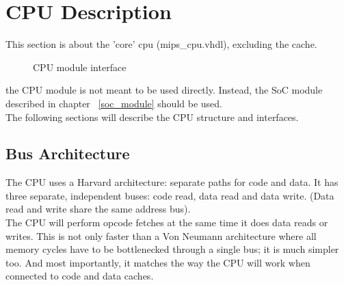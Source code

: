 
\chapter{CPU Description}
\label{cpu_description}

    This section is about the 'core' cpu (mips\_cpu.vhdl), excluding the cache.

    \begin{figure}[h]
    \caption{CPU module interface\label{cpu_symbol}}
    \end{figure}
    
    the CPU module is not meant to be used directly. Instead, the SoC module
    described in chapter ~\ref{soc_module} should be used.\\
    
    The following sections will describe the CPU structure and interfaces.\\
    
\section{Bus Architecture}
\label{bus_architecture}
    The CPU uses a Harvard architecture: separate paths for code and data. It
    has three separate, independent buses: code read, data read and data write.
    (Data read and write share the same address bus).\\

    The CPU will perform opcode fetches at the same time it does data reads
    or writes. This is not only faster than a Von Neumann architecture where
    all memory cycles have to be bottlenecked through a single bus; it is much
    simpler too. And most importantly, it matches the way the CPU will work
    when connected to code and data caches.\\

